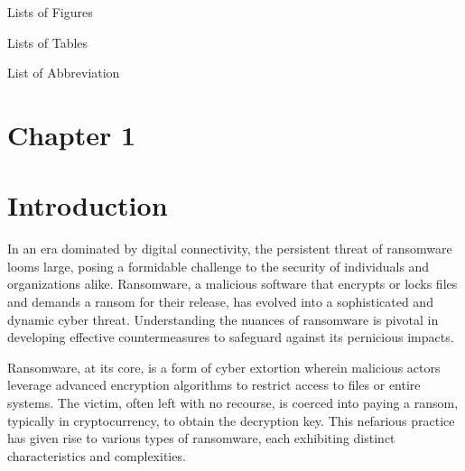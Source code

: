 \documentclass[12pt,letterpaper]{article}
\begin{document}
\newpage
\renewcommand{\listfigurename}{}
\renewcommand{\listtablename}{}
\begin{center}
    \Large {Lists of Figures}
    \listoffigures
    \Large {Lists of Tables}
    \listoftables
    \vspace{1.2cm}
\end{center}

\newpage
\begin{center}
    \vspace*{1cm}
    \Large{List of Abbreviation}
     
    \vspace{1.2cm}
\end{center}


\newpage
    \begin{center}
        \tableofcontents
        \newpage
        \clearpage
    \end{center}


\newpage
{}
\section*{Chapter 1}
\vspace*{1.2 cm}

    \section{Introduction}

    In an era dominated by digital connectivity, the persistent threat of ransomware looms large, posing a formidable challenge to the security of individuals and organizations alike. Ransomware, a malicious software that encrypts or locks files and demands a ransom for their release, has evolved into a sophisticated and dynamic cyber threat. Understanding the nuances of ransomware is pivotal in developing effective countermeasures to safeguard against its pernicious impacts.\cite{AKBANOV2019111}

    Ransomware, at its core, is a form of cyber extortion wherein malicious actors leverage advanced encryption algorithms to restrict access to files or entire systems. The victim, often left with no recourse, is coerced into paying a ransom, typically in cryptocurrency, to obtain the decryption key. This nefarious practice has given rise to various types of ransomware, each exhibiting distinct characteristics and complexities.
    
\end{document}
